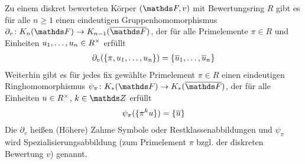 \documentclass[ngerman,fontsize=11pt, paper=a4, parskip=half, titlepage=true, toc=bib]{scrartcl}
\begin{document}
\begin{Satz}\label{homomorphismen}
  Zu einem diskret bewerteten Körper $(\F,v)$ mit Bewertungsring $R$
  gibt es für alle $n\geq 1$ einen eindeutigen Gruppenhomomorphismus 
  $\partial_v\colon \KnF\to \K_{n-1}(\bF)$,
  der für alle Primelemente $\pi\in R$ und 
  Einheiten $u_1,\dotsc, u_n\in R^\times$ erfüllt
  \begin{gather}\label{relationzahmessymbol}
    \partial_v(\{\pi,u_1,\dotsc,u_n\})=\{\overline u_1, \dotsc, \overline u_n\}
  \end{gather}
  Weiterhin gibt es für jedes fix gewählte Primelement $\pi\in R$
  einen eindeutigen Ringhomomorphismus $\psi_\pi\colon\KF\to\KbF$, 
  der für alle Einheiten $u\in R^\times$, $k\in\Z$ erfüllt
  \begin{gather}\label{relationspezialisierung}
    \psi_\pi(\{\pi^ku\})=\{\overline u\}
  \end{gather}
  Die $\partial_v$ heißen (Höhere) Zahme Symbole 
  oder Restklassenabbildungen und $\psi_\pi$
  wird Spezialisierungsabbildung (zum Primelement $\pi$ bzgl. der
  diskreten Bewertung $v$) genannt.
\end{Satz}
\end{document}
